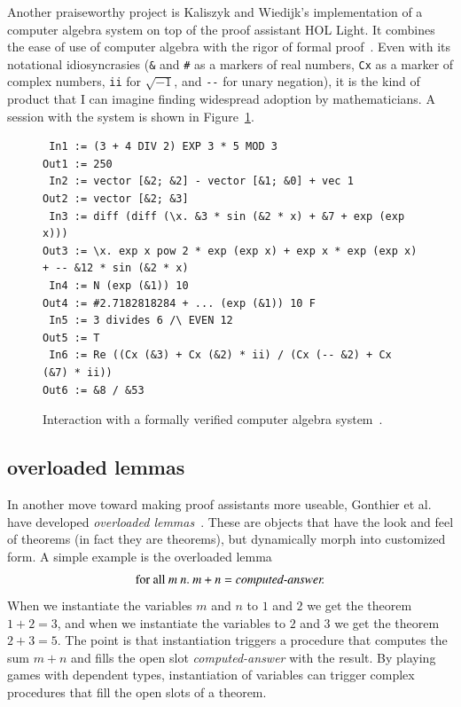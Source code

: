 \documentclass{llncs}
\begin{document}

\smallskip

Another praiseworthy project is Kaliszyk and Wiedijk's implementation
of a computer algebra system on top of the proof assistant HOL Light.
It combines the ease of use of computer algebra with the rigor of
formal proof~\cite{kaliszyk_p04_calc}.  Even with its notational
idiosyncrasies (\verb!&! and \verb!#! as a markers of real numbers,
\verb!Cx! as a marker of complex numbers, \verb!ii! for $\sqrt{-1}$,
and \verb!--! for unary negation), it is the kind of product that I
can imagine finding widespread adoption by mathematicians. A session
with the system is shown in Figure~\ref{fig:kw}.

\begin{figure}
\begin{verbatim}
 In1 := (3 + 4 DIV 2) EXP 3 * 5 MOD 3 
Out1 := 250 
 In2 := vector [&2; &2] - vector [&1; &0] + vec 1 
Out2 := vector [&2; &3] 
 In3 := diff (diff (\x. &3 * sin (&2 * x) + &7 + exp (exp x))) 
Out3 := \x. exp x pow 2 * exp (exp x) + exp x * exp (exp x) + -- &12 * sin (&2 * x) 
 In4 := N (exp (&1)) 10 
Out4 := #2.7182818284 + ... (exp (&1)) 10 F 
 In5 := 3 divides 6 /\ EVEN 12 
Out5 := T 
 In6 := Re ((Cx (&3) + Cx (&2) * ii) / (Cx (-- &2) + Cx (&7) * ii)) 
Out6 := &8 / &53 
\end{verbatim}
\caption{Interaction with a formally verified computer algebra system~\cite{kaliszyk_p04_calc}.}
\label{fig:kw}
\end{figure}


\subsection{overloaded lemmas}



In another move toward making proof assistants more useable, Gonthier
et al.  have developed {\it overloaded lemmas}~\cite{gonHoc}.  These
are objects that have the look and feel of theorems (in fact they are
theorems), but dynamically morph into customized form.  A simple
example is the overloaded lemma
\[
\text{for all}~m~n.~m+n  = \text{\it computed-answer.}
\]
When we instantiate the variables $m$ and $n$ to $1$ and $2$ we get
the theorem $1+2=3$, and when we instantiate the variables to $2$ and
$3$ we get the theorem $2+3=5$.  The point is that instantiation
triggers a procedure that computes the sum $m+n$ and fills the open
slot {\it computed-answer} with the result.  By playing games with
dependent types, instantiation of variables can trigger complex
procedures that fill the open slots of a theorem.
\end{document}
